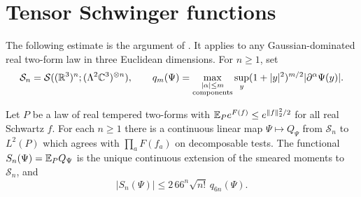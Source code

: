 \section{Tensor Schwinger functions}\label{sec:tensors}
The following estimate is the argument of
\cite[Section~5.3]{QED3Manuscript}. It applies to any
Gaussian-dominated real two-form law in three Euclidean dimensions.
For \(n\ge1\), set
\[
 \mathcal S_n=\mathcal S((\mathbb R^3)^n;(\Lambda^2\mathbb C^3)^{\otimes n}),\qquad
 q_m(\Psi)=\max_{\substack{|\alpha|\le m\\\text{components}}}
 \sup_y(1+|y|^2)^{m/2}|\partial^\alpha\Psi(y)|.
\]
\begin{proposition}\label{prop:tensor-growth}
Let \(P\) be a law of real tempered two-forms with
\(\mathbb E_Pe^{F(f)}\le e^{\|f\|_2^2/2}\) for all real Schwartz \(f\).
For each \(n\ge1\) there is a continuous linear map
\(\Psi\mapsto Q_\Psi\) from \(\mathcal S_n\) to \(L^2(P)\)
which agrees with \(\prod_aF(f_a)\) on decomposable tests.
The functional \(S_n(\Psi)=\mathbb E_PQ_\Psi\) is the unique continuous
extension of the smeared moments to \(\mathcal S_n\), and
\begin{equation}\label{eq:tensor-growth}
 |S_n(\Psi)|\le2\,66^n\sqrt{n!}\,q_{6n}(\Psi).
\end{equation}
\end{proposition}

